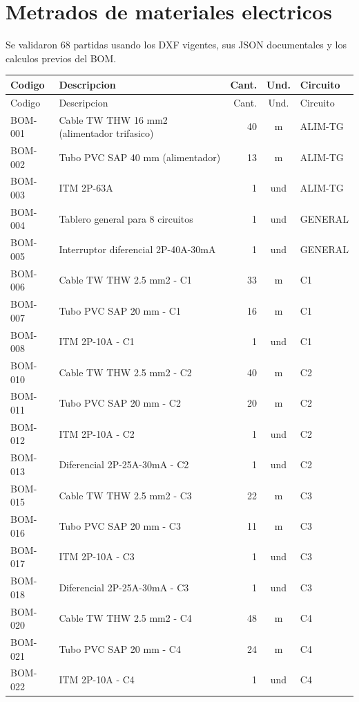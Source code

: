 \section{Metrados de materiales electricos}
Se validaron 68 partidas usando los DXF vigentes, sus JSON documentales y los calculos previos del BOM.
\scriptsize
\begin{longtable}{p{1.7cm}p{7.5cm}r c p{2.2cm}}
\toprule Codigo & Descripcion & Cant. & Und. & Circuito \\ \midrule
\endfirsthead\toprule Codigo & Descripcion & Cant. & Und. & Circuito \\ \midrule\endhead
BOM-001 & Cable TW THW 16 mm2 (alimentador trifasico) & 40 & m & ALIM-TG \\
BOM-002 & Tubo PVC SAP 40 mm (alimentador) & 13 & m & ALIM-TG \\
BOM-003 & ITM 2P-63A & 1 & und & ALIM-TG \\
BOM-004 & Tablero general para 8 circuitos & 1 & und & GENERAL \\
BOM-005 & Interruptor diferencial 2P-40A-30mA & 1 & und & GENERAL \\
BOM-006 & Cable TW THW 2.5 mm2 - C1 & 33 & m & C1 \\
BOM-007 & Tubo PVC SAP 20 mm - C1 & 16 & m & C1 \\
BOM-008 & ITM 2P-10A - C1 & 1 & und & C1 \\
BOM-010 & Cable TW THW 2.5 mm2 - C2 & 40 & m & C2 \\
BOM-011 & Tubo PVC SAP 20 mm - C2 & 20 & m & C2 \\
BOM-012 & ITM 2P-10A - C2 & 1 & und & C2 \\
BOM-013 & Diferencial 2P-25A-30mA - C2 & 1 & und & C2 \\
BOM-015 & Cable TW THW 2.5 mm2 - C3 & 22 & m & C3 \\
BOM-016 & Tubo PVC SAP 20 mm - C3 & 11 & m & C3 \\
BOM-017 & ITM 2P-10A - C3 & 1 & und & C3 \\
BOM-018 & Diferencial 2P-25A-30mA - C3 & 1 & und & C3 \\
BOM-020 & Cable TW THW 2.5 mm2 - C4 & 48 & m & C4 \\
BOM-021 & Tubo PVC SAP 20 mm - C4 & 24 & m & C4 \\
BOM-022 & ITM 2P-10A - C4 & 1 & und & C4 \\

\end{longtable}
